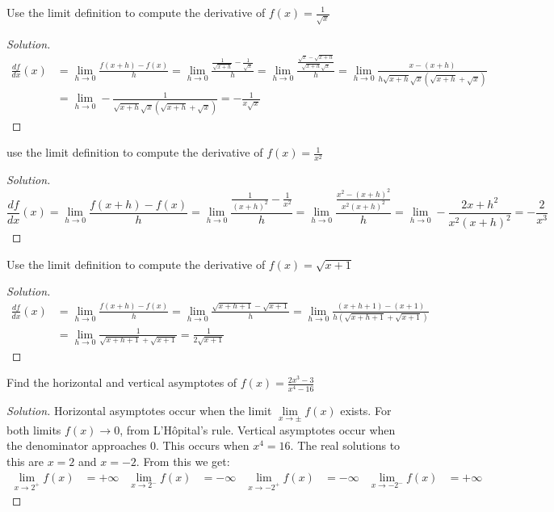 \documentclass[crop=false,class=book]{standalone}
\begin{document}
\begin{problem}
Use the limit definition to compute the derivative of $f(x)=\frac{1}{\sqrt{x}}$
\end{problem}
\begin{proof}[Solution]
\begin{align*}
    \frac{df}{dx}(x)&=\underset{h\rightarrow 0}{\lim}\frac{f(x+h)-f(x)}{h}=\underset{h\rightarrow 0}{\lim}\frac{\frac{1}{\sqrt{x+h}}-\frac{1}{\sqrt{x}}}{h}=\underset{h\rightarrow 0}{\lim}\frac{\frac{\sqrt{x}-\sqrt{x+h}}{\sqrt{x+h}\sqrt{x}}}{h}=\underset{h\rightarrow 0}{\lim}\frac{x-(x+h)}{h\sqrt{x+h}\sqrt{x}(\sqrt{x+h}+\sqrt{x})}\\
    &=\underset{h\rightarrow 0}{\lim}-\frac{1}{\sqrt{x+h}\sqrt{x}(\sqrt{x+h}+\sqrt{x})}=-\frac{1}{x\sqrt{x}}
\end{align*}
\end{proof}
\begin{problem}
use the limit definition to compute the derivative of $f(x)=\frac{1}{x^{2}}$
\end{problem}
\begin{proof}[Solution]
\begin{equation*}
    \frac{df}{dx}(x)=\underset{h\rightarrow 0}{\lim}\frac{f(x+h)-f(x)}{h}=\underset{h\rightarrow 0}{\lim}\frac{\frac{1}{(x+h)^{2}}-\frac{1}{x^{2}}}{h}=\underset{h\rightarrow 0}{\lim}\frac{\frac{x^{2}-(x+h)^{2}}{x^{2}(x+h)^{2}}}{h}=\underset{h\rightarrow 0}{\lim}-\frac{2x+h^{2}}{x^{2}(x+h)^{2}}=-\frac{2}{x^{3}}
\end{equation*}
\end{proof}
\begin{problem}
Use the limit definition to compute the derivative of $f(x)=\sqrt{x+1}$
\end{problem}
\begin{proof}[Solution]
\begin{align*}
    \frac{df}{dx}(x)&=\underset{h\rightarrow 0}{\lim}\frac{f(x+h)-f(x)}{h}=\underset{h\rightarrow 0}{\lim}\frac{\sqrt{x+h+1}-\sqrt{x+1}}{h}=\underset{h\rightarrow 0}{\lim}\frac{(x+h+1)-(x+1)}{h(\sqrt{x+h+1}+\sqrt{x+1})}\\
    &=\underset{h\rightarrow 0}{\lim}\frac{1}{\sqrt{x+h+1}+\sqrt{x+1}}=\frac{1}{2\sqrt{x+1}}
\end{align*}
\end{proof}
\begin{problem}
Find the horizontal and vertical asymptotes of $f(x)=\frac{2x^{3}-3}{x^{4}-16}$
\end{problem}
\begin{proof}[Solution]
Horizontal asymptotes occur when the limit $\underset{x\rightarrow\pm}{\lim}f(x)$ exists. For both limits $f(x)\rightarrow 0$, from L'H\^{o}pital's rule. Vertical asymptotes occur when the denominator approaches 0. This occurs when $x^{4}=16$. The real solutions to this are $x=2$ and $x=-2$. From this we get:
\begin{align*}
    \underset{x\rightarrow 2^{+}}{\lim}f(x)&=+\infty&\underset{x\rightarrow 2^{-}}{\lim}f(x)&=-\infty&\underset{x\rightarrow -2^{+}}{\lim}f(x)&=-\infty&\underset{x\rightarrow -2^{-}}{\lim}f(x)&=+\infty
\end{align*}
\end{proof}
\end{document}

